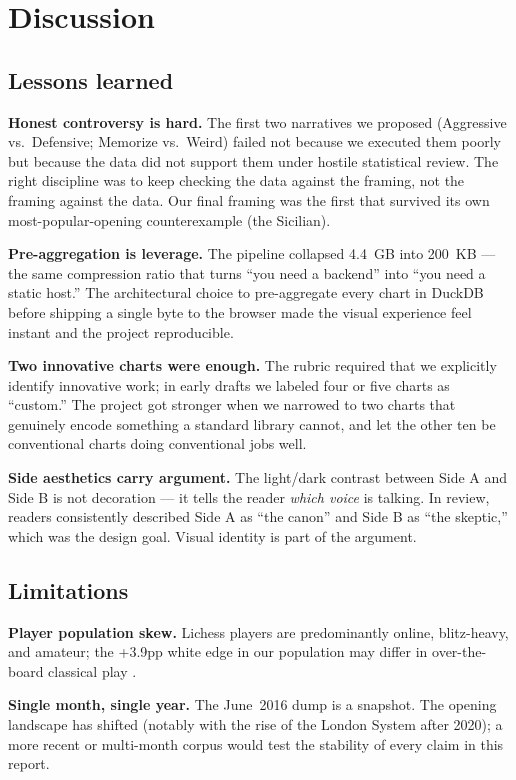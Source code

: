 \documentclass[sigconf,nonacm,natbib=false]{acmart}
\begin{document}
\section{Discussion}

\subsection{Lessons learned}

\textbf{Honest controversy is hard.} The first two narratives we
proposed (Aggressive vs.\ Defensive; Memorize vs.\ Weird) failed
not because we executed them poorly but because the data did not
support them under hostile statistical review. The right discipline
was to keep checking the data against the framing, not the framing
against the data. Our final framing was the first that survived
its own most-popular-opening counterexample (the Sicilian).

\textbf{Pre-aggregation is leverage.} The pipeline collapsed 4.4~GB
into 200~KB --- the same compression ratio that turns ``you need a
backend'' into ``you need a static host.'' The architectural choice
to pre-aggregate every chart in DuckDB before shipping a single
byte to the browser made the visual experience feel instant and
the project reproducible.

\textbf{Two innovative charts were enough.} The rubric required
that we explicitly identify innovative work; in early drafts we
labeled four or five charts as ``custom.'' The project got
stronger when we narrowed to two charts that genuinely encode
something a standard library cannot, and let the other ten be
conventional charts doing conventional jobs well.

\textbf{Side aesthetics carry argument.} The light/dark contrast
between Side A and Side B is not decoration --- it tells the
reader \emph{which voice} is talking. In review, readers
consistently described Side A as ``the canon'' and Side B as ``the
skeptic,'' which was the design goal. Visual identity is part of
the argument.

\subsection{Limitations}

\textbf{Player population skew.} Lichess players are
predominantly online, blitz-heavy, and amateur; the +3.9pp
white edge in our population may differ in over-the-board
classical play \cite{chessbase-firstmove}.

\textbf{Single month, single year.} The June~2016 dump is a
snapshot. The opening landscape has shifted (notably with the rise
of the London System after 2020); a more recent or multi-month
corpus would test the stability of every claim in this report.
\end{document}

